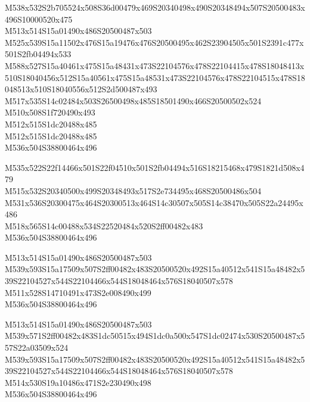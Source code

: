 \documentclass{article}
\begin{document}
\begin{multicols}{5}
\begin{center}
M538x532S2b705524x508S36d00479x469S20340498x490S20348494x507S20500483x496S10000520x475 %
\\M513x514S15a01490x486S20500487x503 %
\\M525x539S15a11502x476S15a19476x476S20500495x462S23904505x501S2391c477x501S2fb04494x533 %
\\M588x527S15a40461x475S15a48431x473S22104576x478S22104415x478S18048413x510S18040456x512S15a40561x475S15a48531x473S22104576x478S22104515x478S18048513x510S18040556x512S2d500487x493 %
\\M517x535S14c02484x503S26500498x485S18501490x466S20500502x524 %
\\M510x508S1f720490x493 %
\\M512x515S1dc20488x485 %
\\M512x515S1dc20488x485 %
\\M536x504S38800464x496 %

M535x522S22f14466x501S22f04510x501S2fb04494x516S18215468x479S1821d508x479 %
\\M515x532S20340500x499S20348493x517S2e734495x468S20500486x504 %
\\M531x536S20300475x464S20300513x464S14c30507x505S14c38470x505S22a24495x486 %
\\M518x565S14c00488x534S22520484x520S2ff00482x483 %
\\M536x504S38800464x496 %

M513x514S15a01490x486S20500487x503 %
\\M539x593S15a17509x507S2ff00482x483S20500520x492S15a40512x541S15a48482x539S22104527x544S22104466x544S18048464x576S18040507x578 %
\\M511x528S14710491x473S2e008490x499 %
\\M536x504S38800464x496 %

M513x514S15a01490x486S20500487x503 %
\\M539x571S2ff00482x483S1dc50515x494S1dc0a500x547S1dc02474x530S20500487x557S22a03509x524 %
\\M539x593S15a17509x507S2ff00482x483S20500520x492S15a40512x541S15a48482x539S22104527x544S22104466x544S18048464x576S18040507x578 %
\\M514x530S19a10486x471S2e230490x498 %
\\M536x504S38800464x496 %


\end{center}
\end{multicols}
\end{document}
